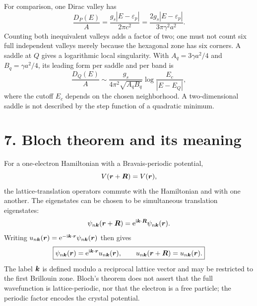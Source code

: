 For comparison, one Dirac valley has
\[
\frac{D_P(E)}A=\frac{g_s|E-\varepsilon_p|}{2\pi c^2}
=\frac{2g_s|E-\varepsilon_p|}{3\pi\gamma^2a^2}.
\]
Counting both inequivalent valleys adds a factor of two; one must not count six full independent valleys merely because the hexagonal zone has six corners. A saddle at $Q$ gives a logarithmic local singularity. With $A_q=3\gamma a^2/4$ and $B_q=\gamma a^2/4$, its leading form per saddle and per band is
\[
\frac{D_Q(E)}A\sim\frac{g_s}{4\pi^2\sqrt{A_qB_q}}
\log\frac{E_c}{|E-E_Q|},
\]
where the cutoff $E_c$ depends on the chosen neighborhood. A two-dimensional saddle is not described by the step function of a quadratic minimum.

\section*{7. Bloch theorem and its meaning}
For a one-electron Hamiltonian with a Bravais-periodic potential,
\[
V(\boldsymbol{r}+\boldsymbol{R})=V(\boldsymbol{r}),
\]
the lattice-translation operators commute with the Hamiltonian and with one another. The eigenstates can be chosen to be simultaneous translation eigenstates:
\[
\psi_{n\boldsymbol{k}}(\boldsymbol{r}+\boldsymbol{R})=\mathrm{e}^{\mathrm{i}\boldsymbol{k}\cdot\boldsymbol{R}}
\psi_{n\boldsymbol{k}}(\boldsymbol{r}).
\]
Writing $u_{n\boldsymbol{k}}(\boldsymbol{r})=\mathrm{e}^{-\mathrm{i}\boldsymbol{k}\cdot\boldsymbol{r}}\psi_{n\boldsymbol{k}}(\boldsymbol{r})$ then gives
\[
\boxed{\psi_{n\boldsymbol{k}}(\boldsymbol{r})=\mathrm{e}^{\mathrm{i}\boldsymbol{k}\cdot\boldsymbol{r}}u_{n\boldsymbol{k}}(\boldsymbol{r}),
\qquad u_{n\boldsymbol{k}}(\boldsymbol{r}+\boldsymbol{R})=u_{n\boldsymbol{k}}(\boldsymbol{r}).}
\]
The label $\boldsymbol{k}$ is defined modulo a reciprocal lattice vector and may be restricted to the first Brillouin zone. Bloch's theorem does not assert that the full wavefunction is lattice-periodic, nor that the electron is a free particle; the periodic factor encodes the crystal potential.

